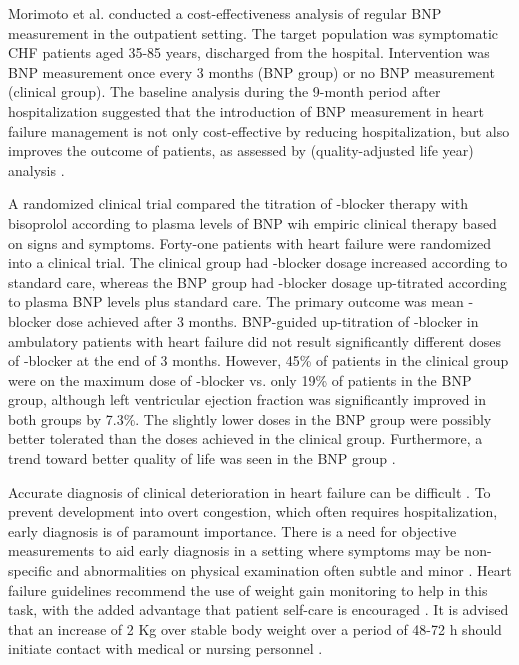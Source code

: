 \documentclass[14pt,a4paper,onecolumn]{extarticle}
\begin{document}
Morimoto et al. conducted a cost-effectiveness analysis of regular BNP measurement in the outpatient setting. The target population was symptomatic CHF patients aged 35-85 years,  discharged from the hospital. Intervention was BNP measurement once every 3 months (BNP group) or no BNP measurement (clinical group). The baseline analysis during the 9-month period after hospitalization suggested that the introduction of BNP measurement in heart failure management is not only cost-effective by reducing hospitalization, but also improves the outcome of patients, as assessed by (quality-adjusted life year) analysis \citep{bib3263}.

A  randomized clinical trial compared the titration of \beta-blocker therapy with bisoprolol according to plasma levels of BNP wih empiric clinical therapy based on signs and symptoms. Forty-one patients with heart failure were randomized into a clinical trial. The clinical group had \beta-blocker dosage increased according to standard care, whereas the BNP group had \beta-blocker dosage up-titrated according to plasma BNP levels plus standard care. The primary outcome was mean \beta-blocker dose achieved after 3 months. BNP-guided up-titration of \beta-blocker in ambulatory patients with heart failure did not result significantly different doses of \beta-blocker at the end of 3 months. However, 45\% of patients in the clinical group were on the maximum dose of \beta-blocker vs. only 19\% of patients in the BNP group, although left ventricular ejection fraction was significantly improved in both groups by 7.3\%. The slightly lower doses in the BNP group were possibly better tolerated than the doses achieved in the clinical group. Furthermore, a trend toward better quality of life was seen in the BNP group \citep{bib3294}.

Accurate diagnosis of clinical deterioration in heart failure can be difficult \citep{bib368} \citep{bib369}. To prevent development into overt congestion, which often requires hospitalization, early diagnosis is of paramount importance. There is a need for objective measurements to aid early diagnosis in a setting where symptoms may be non-specific and abnormalities on physical examination often subtle and minor \citep{bib3295}. Heart failure guidelines recommend the use of weight gain monitoring to help in this task, with the added advantage that patient self-care is encouraged \citep{bib368} \citep{bib369}. It is advised that an increase of 2 Kg over stable body weight over a period of 48-72 h should initiate contact with medical or nursing personnel \citep{bib368} \citep{bib369} \citep{bib3295}.
\end{document}
